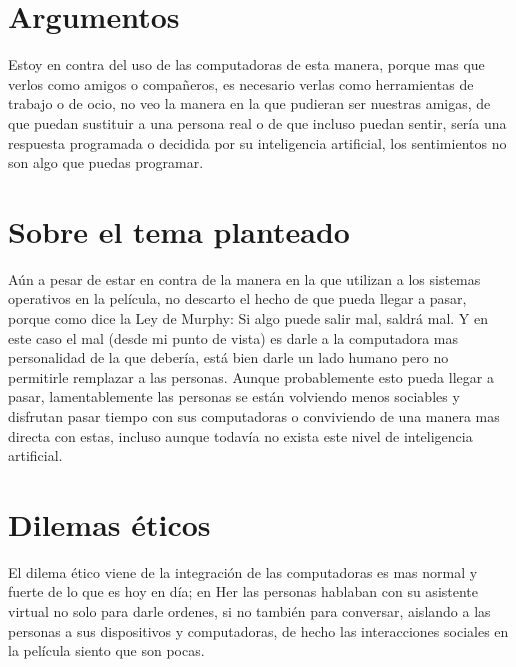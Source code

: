 \documentclass[paper=a4, fontsize=12pt]{scrartcl} %
\begin{document}

\section{Argumentos}

Estoy en contra del uso de las computadoras de esta manera, porque mas que verlos como amigos o compañeros, es necesario verlas como herramientas de trabajo o de ocio, no veo la manera en la que pudieran ser nuestras amigas, de que puedan sustituir a una persona real o de que incluso puedan sentir, sería una respuesta programada o decidida por su inteligencia artificial, los sentimientos no son algo que puedas programar.


\section{Sobre el tema planteado}

Aún a pesar de estar en contra de la manera en la que utilizan a los sistemas operativos en la película, no descarto el hecho de que pueda llegar a pasar, porque como dice la Ley de Murphy: Si algo puede salir mal, saldrá mal. Y en este caso el mal (desde mi punto de vista) es darle a la computadora mas personalidad de la que debería, está bien darle un lado humano pero no permitirle remplazar a las personas. Aunque probablemente esto pueda llegar a pasar, lamentablemente las personas se están volviendo menos sociables y disfrutan pasar tiempo con sus computadoras o conviviendo de una manera mas directa con estas, incluso aunque todavía no exista este nivel de inteligencia artificial.


\section{Dilemas éticos}

El dilema ético viene de la integración de las computadoras es mas normal y fuerte de lo que es hoy en día; en Her las personas hablaban con su asistente virtual no solo para darle ordenes, si no también para conversar, aislando a las personas a sus dispositivos y computadoras, de hecho las interacciones sociales en la película siento que son pocas.\vspace{4mm}
\end{document}
